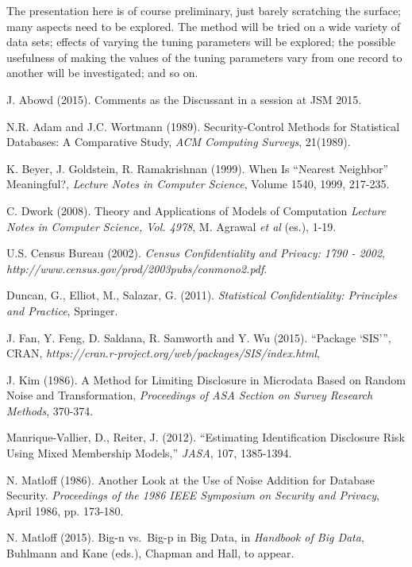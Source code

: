 \documentclass[11pt]{article}
\begin{document}
The presentation here is of course preliminary, just barely scratching
the surface; many aspects need to be explored.  The method will be tried
on a wide variety of data sets; effects of varying the tuning parameters
will be explored; the possible usefulness of making the values of the
tuning parameters vary from one record to another will be investigated;
and so on.

\begin{thebibliography}{}

 J. Abowd (2015). Comments as the Discussant in a session
at JSM 2015.

N.R. Adam and J.C. Wortmann (1989).
Security-Control Methods for Statistical Databases: A Comparative Study,
{\it ACM Computing Surveys}, 21(1989).

 K. Beyer, J. Goldstein, R. Ramakrishnan (1999).  When Is
``Nearest Neighbor'' Meaningful?, {\it Lecture Notes in Computer
Science}, Volume 1540, 1999, 217-235.

 C. Dwork (2008).  Theory and Applications of Models of
Computation {\it Lecture Notes in Computer Science, Vol. 4978}, M.
Agrawal {\it et al} (es.), 1-19.

 U.S. Census Bureau (2002). 
{\it Census Confidentiality and Privacy: 1790 - 2002},
{\it http://www.census.gov/prod/2003pubs/conmono2.pdf}.

 Duncan, G., Elliot, M., Salazar, G. (2011).  {\it
Statistical Confidentiality: Principles and Practice}, Springer. 

 J. Fan, Y. Feng, D. Saldana, R. Samworth and Y. Wu (2015).
``Package `SIS''', CRAN, {\it
https://cran.r-project.org/web/packages/SIS/index.html},

 J. Kim (1986).  A Method for Limiting Disclosure in
Microdata Based on Random Noise and Transformation, {\it Proceedings of
ASA Section on Survey Research Methods}, 370-374.

 Manrique-Vallier, D., Reiter, J. (2012).
``Estimating Identification Disclosure Risk Using Mixed Membership
Models,'' {\it JASA}, 107, 1385-1394.

 N. Matloff (1986). Another Look at the Use of
Noise Addition for Database Security. {\it Proceedings of the 1986 IEEE
Symposium on Security and Privacy}, April 1986, pp. 173-180.

  N. Matloff (2015).  Big-n vs.\ Big-p in Big Data,
in {\it Handbook of Big Data}, Buhlmann and Kane (eds.), Chapman and
Hall, to appear.


\end{thebibliography}
\end{document}
